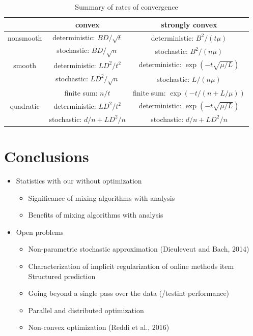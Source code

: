 \documentclass[b5paper]{report}
\begin{document}
\begin{table}[h]
  \def\arraystretch{1.4}
  \centering
  \begin{tabular}{|c|c|c|}
    \hline
    & \textbf{convex} & \textbf{strongly convex} \\
    \hline
    nonsmooth & deterministic: $BD/\sqrt{t}$ & deterministic: $B^2/(t\mu)$ \\
              & stochastic: $BD/\sqrt{n}$ & stochastic: $B^2/(n\mu)$ \\
    \hline
    smooth & deterministic: $LD^2/t^2$ & deterministic: $\exp(-t\sqrt{\mu/L})$ \\
           & stochastic: $LD^2/\sqrt{n}$ & stochastic: $L/(n\mu)$ \\
           & finite sum: $n/t$ & finite sum: $\exp(-t/(n+L/\mu))$ \\
    \hline
    quadratic & deterministic: $LD^2/t^2$ & deterministic: $\exp(-t\sqrt{\mu/L})$ \\
              & stochastic: $d/n + LD^2/n$ & stochastic: $d/n + LD^2/n$ \\
    \hline
  \end{tabular}
  \caption{Summary of rates of convergence}
\end{table}

\section{Conclusions}

\begin{itemize}
  \item Statistics with our without optimization
    \begin{itemize}
      \item Significance of mixing algorithms with analysis
      \item Benefits of mixing algorithms with analysis
    \end{itemize}
  \item Open problems
    \begin{itemize}
      \item Non-parametric stochastic approximation (Dieuleveut and Bach, 2014)
      \item Characterization of implicit regularization of online methods
      item Structured prediction
      \item Going beyond a single pass over the data (/testint performance)
      \item Parallel and distributed optimization
      \item Non-convex optimization (Reddi et al., 2016)
    \end{itemize}
\end{itemize}
\end{document}
